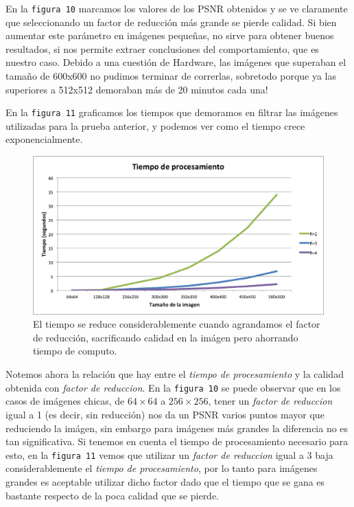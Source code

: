 \documentclass[a4paper]{article}
\begin{document}
En la \texttt{figura 10} marcamos los valores de los PSNR obtenidos y se ve claramente que seleccionando un factor de reducción más grande se pierde calidad. Si bien aumentar este parámetro en imágenes pequeñas, no sirve para obtener buenos resultados, si nos permite extraer conclusiones del comportamiento, que es nuestro caso.
Debido a una cuestión de Hardware, las imágenes que superaban el tamaño de 600x600 no pudimos terminar de correrlas, sobretodo porque ya las superiores a 512x512 demoraban más de 20 minutos cada una!

En la \texttt{figura 11} graficamos los tiempos que demoramos en filtrar las imágenes utilizadas para la prueba anterior, y podemos ver como el tiempo crece exponencialmente.

\begin{figure}[H]
  \centering
  \includegraphics[scale=0.8]{graficos/Tiempo-factor_reduccion.png}
  \caption{ El tiempo se reduce considerablemente cuando agrandamos el factor de reducción, sacrificando calidad en la imágen pero ahorrando tiempo de computo. }
\end{figure}

Notemos ahora la relación que hay entre el \textit{tiempo de procesamiento} y la calidad obtenida con \textit{factor de reduccion}. En la \texttt{figura 10} se puede observar que en los casos de imágenes chicas, de $64 \times 64$ a $256 \times 256$, tener un \textit{factor de reduccion} igual a 1 (es decir, sin reducción) nos da un PSNR varios puntos mayor que reduciendo la imágen, sin embargo para imágenes más grandes la diferencia no es tan significativa. Si tenemos en cuenta el tiempo de procesamiento necesario para esto, en la \texttt{figura 11} vemos que utilizar un \textit{factor de reduccion} igual a 3 baja considerablemente el \textit{tiempo de procesamiento}, por lo tanto para imágenes grandes es aceptable utilizar dicho factor dado que el tiempo que se gana es bastante respecto de la poca calidad que se pierde.
\end{document}
